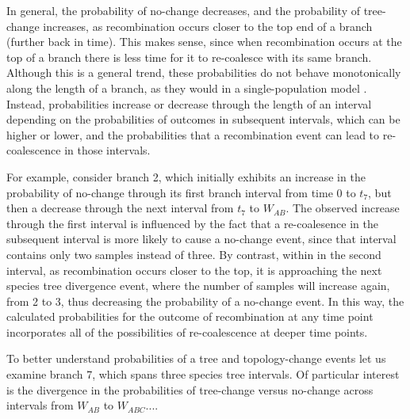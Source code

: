 \documentclass[11pt]{article}
\begin{document}
In general, the probability of no-change decreases, and the probability
of tree-change increases, as recombination occurs closer to the top
end of a branch (further back in time). This makes sense, since when 
recombination occurs at the top of a branch there is less time
for it to re-coalesce with its same branch. Although this is a general
trend, these probabilities do not behave monotonically along the length
of a branch, as they would in a single-population model \citep{deng_distribution_2021}.
Instead, probabilities increase or decrease through the length of an 
interval depending on the probabilities of outcomes in subsequent intervals, 
which can be higher or lower, and the probabilities that a recombination 
event can lead to re-coalescence in those intervals.

For example, consider branch 2, which initially exhibits an increase in the
probability of no-change through its first branch interval from time 0 to
$t_7$, but then a decrease through the next interval from $t_7$ to $W_{AB}$.
The observed increase through the first interval is influenced by the fact that
a re-coalesence in the subsequent interval is more likely to cause a no-change
event, since that interval contains only two samples instead of three.
By contrast, within in the second interval, as recombination occurs closer to 
the top, it is approaching the next species tree divergence event, where the 
number of samples will increase again, from 2 to 3, 
thus decreasing the probability of a no-change event. In this way, 
the calculated probabilities for the outcome of recombination at any time 
point incorporates all of the possibilities of re-coalescence at deeper 
time points.

To better understand probabilities of a tree and topology-change events let 
us examine branch 7, which spans three species tree intervals. Of particular 
interest is the divergence in the probabilities of tree-change versus no-change
across intervals from $W_{AB}$ to $W_{ABC}$....
\end{document}
